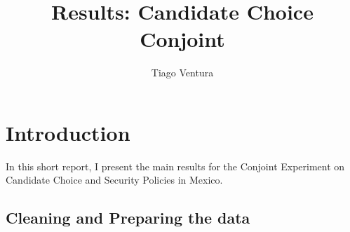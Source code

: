 \documentclass[12pt,]{article}
\title{Results: Candidate Choice Conjoint}
\author{Tiago Ventura}
\date{}
\begin{document}
\maketitle

\hypertarget{introduction}{%
\section{Introduction}\label{introduction}}

In this short report, I present the main results for the Conjoint
Experiment on Candidate Choice and Security Policies in Mexico.

\hypertarget{cleaning-and-preparing-the-data}{%
\subsection{Cleaning and Preparing the
data}\label{cleaning-and-preparing-the-data}}
\end{document}
